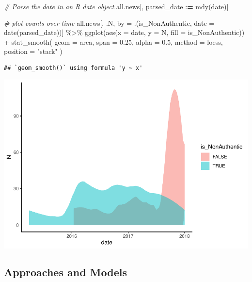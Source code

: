 \documentclass[
]{article}
\newenvironment{Shaded}{\begin{snugshade}}{\end{snugshade}}
\newcommand{\AttributeTok}[1]{\textcolor[rgb]{0.77,0.63,0.00}{#1}}
\newcommand{\CommentTok}[1]{\textcolor[rgb]{0.56,0.35,0.01}{\textit{#1}}}
\newcommand{\ErrorTok}[1]{\textcolor[rgb]{0.64,0.00,0.00}{\textbf{#1}}}
\newcommand{\FloatTok}[1]{\textcolor[rgb]{0.00,0.00,0.81}{#1}}
\newcommand{\FunctionTok}[1]{\textcolor[rgb]{0.00,0.00,0.00}{#1}}
\newcommand{\NormalTok}[1]{#1}
\newcommand{\OtherTok}[1]{\textcolor[rgb]{0.56,0.35,0.01}{#1}}
\newcommand{\SpecialCharTok}[1]{\textcolor[rgb]{0.00,0.00,0.00}{#1}}
\newcommand{\StringTok}[1]{\textcolor[rgb]{0.31,0.60,0.02}{#1}}
\begin{document}
\pagebreak

\begin{Shaded}
\begin{Highlighting}[]
\CommentTok{\# Parse the date in an R date object}
\NormalTok{all.news[, parsed\_date }\SpecialCharTok{:}\ErrorTok{=} \FunctionTok{mdy}\NormalTok{(date)]}

\CommentTok{\# plot counts over time}
\NormalTok{all.news[, .N, by }\OtherTok{=}\NormalTok{ .(is\_NonAuthentic, }\AttributeTok{date =} \FunctionTok{date}\NormalTok{(parsed\_date))] }\SpecialCharTok{\%\textgreater{}\%}
  \FunctionTok{ggplot}\NormalTok{(}\FunctionTok{aes}\NormalTok{(}\AttributeTok{x =}\NormalTok{ date, }\AttributeTok{y =}\NormalTok{ N, }\AttributeTok{fill =}\NormalTok{ is\_NonAuthentic)) }\SpecialCharTok{+}
  \FunctionTok{stat\_smooth}\NormalTok{(}
    \AttributeTok{geom =} \StringTok{\textquotesingle{}area\textquotesingle{}}\NormalTok{,}
    \AttributeTok{span =} \FloatTok{0.25}\NormalTok{,}
    \AttributeTok{alpha =} \FloatTok{0.5}\NormalTok{,}
    \AttributeTok{method =} \StringTok{\textquotesingle{}loess\textquotesingle{}}\NormalTok{,}
    \AttributeTok{position =} \StringTok{"stack"}
\NormalTok{  )}
\end{Highlighting}
\end{Shaded}

\begin{verbatim}
## `geom_smooth()` using formula 'y ~ x'
\end{verbatim}

\includegraphics{report_files/figure-latex/parse_and_explore_dates-1.pdf}

\pagebreak

\hypertarget{approaches-and-models}{%
\subsection{Approaches and Models}\label{approaches-and-models}}
\end{document}
